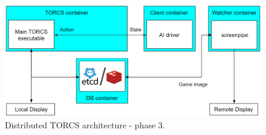 \begin{figure}[h!]
	\centering
	\includegraphics[width=0.9\linewidth]{"immagini/Software development/Development-3"}
	\caption[Distributed TORCS architecture - phase 3.]{Distributed TORCS architecture - phase 3.}
	\label{fig:development-3}
\end{figure}

